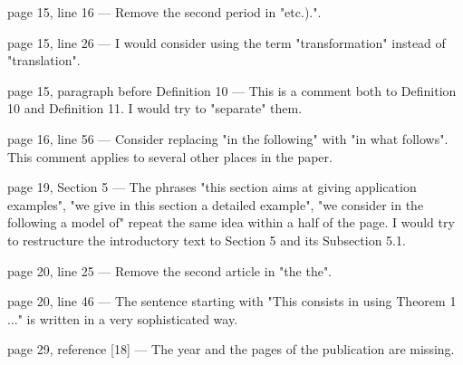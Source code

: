 \documentclass[11pt]{article}
\begin{document}
page 15, line 16 ---
Remove the second period in "etc.).".

page 15, line 26 ---
I would consider using the term "transformation" instead of "translation".

page 15, paragraph before Definition 10 ---
This is a comment both to Definition 10 and Definition 11. I would try to "separate" them.

page 16, line 56 ---
Consider replacing "in the following" with "in what follows".
This comment applies to several other places in the paper.

page 19, Section 5 ---
The phrases "this section aims at giving application examples", "we give in this section a detailed example", "we consider in the following a model of" repeat the same idea within a half of the page. I would try to restructure the introductory text to Section 5 and its Subsection 5.1.

page 20, line 25 ---
Remove the second article in "the the".

page 20, line 46 ---
The sentence starting with "This consists in using Theorem 1 ..." is written in a very sophisticated way.

page 29, reference [18] ---
The year and the pages of the publication are missing.


\end{document}
